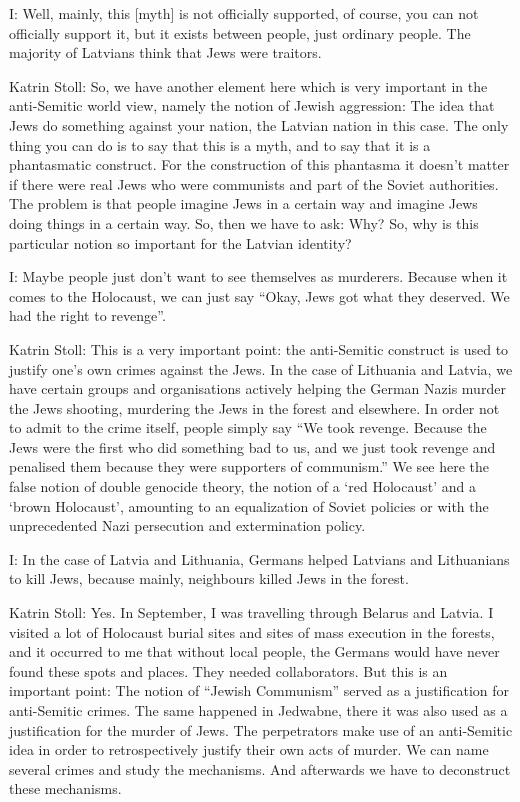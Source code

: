 

I: Well, mainly, this [myth] is not officially supported, of course, you can not officially support it, but it exists between people, just ordinary people. The majority of Latvians think that Jews were traitors. 

 

Katrin Stoll: So, we have another element here which is very important in the anti-Semitic world view, namely the notion of Jewish aggression: The idea that Jews do something against your nation, the Latvian nation in this case. The only thing you can do is to say that this is a myth, and to say that it is a phantasmatic construct. For the construction of this phantasma it doesn’t matter if there were real Jews who were communists and part of the Soviet authorities. The problem is that people imagine Jews in a certain way and imagine Jews doing things in a certain way. So, then we have to ask: Why? So, why is this particular notion so important for the Latvian identity? 

 

I: Maybe people just don’t want to see themselves as murderers. Because when it comes to the Holocaust, we can just say “Okay, Jews got what they deserved. We had the right to revenge”. 

 

Katrin Stoll: This is a very important point: the anti-Semitic construct is used to justify one’s own crimes against the Jews. In the case of Lithuania and Latvia, we have certain groups and organisations actively helping the German Nazis murder the Jews shooting, murdering the Jews in the forest and elsewhere. In order not to admit to the crime itself, people simply say “We took revenge. Because the Jews were the first who did something bad to us, and we just took revenge and penalised them because they were supporters of communism.” We see here the false notion of double genocide theory, the notion of a ‘red Holocaust’ and a ‘brown Holocaust’, amounting to an equalization of Soviet policies or with the unprecedented Nazi persecution and extermination policy.  

 

I: In the case of Latvia and Lithuania, Germans helped Latvians and Lithuanians to kill Jews, because mainly, neighbours killed Jews in the forest. 

 

Katrin Stoll: Yes. In September, I was travelling through Belarus and Latvia. I visited a lot of Holocaust burial sites and sites of mass execution in the forests, and it occurred to me that without local people, the Germans would have never found these spots and places. They needed collaborators.  But this is an important point: The notion of “Jewish Communism” served as a justification for anti-Semitic crimes. The same happened in Jedwabne, there it was also used as a justification for the murder of Jews. The perpetrators make use of an anti-Semitic idea in order to retrospectively justify their own acts of murder. We can name several crimes and study the mechanisms. And afterwards we have to deconstruct these mechanisms. 

